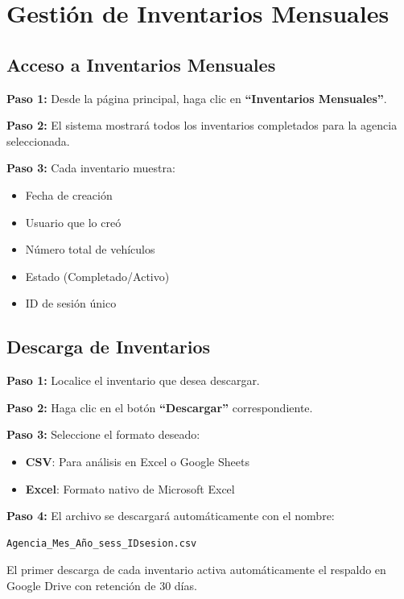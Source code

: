 \documentclass[11pt,a4paper]{article}
\newcommand{\step}[1]{\textbf{\color{primarytext}Paso #1:}}
\newcommand{\button}[1]{\textbf{#1}}
\begin{document}
\section{Gestión de Inventarios Mensuales}

\subsection{Acceso a Inventarios Mensuales}

\step{1} Desde la página principal, haga clic en \button{``Inventarios Mensuales''}.

\step{2} El sistema mostrará todos los inventarios completados para la agencia seleccionada.

\step{3} Cada inventario muestra:
\begin{itemize}
    \item Fecha de creación
    \item Usuario que lo creó
    \item Número total de vehículos
    \item Estado (Completado/Activo)
    \item ID de sesión único
\end{itemize}

\subsection{Descarga de Inventarios}

\step{1} Localice el inventario que desea descargar.

\step{2} Haga clic en el botón \button{``Descargar''} correspondiente.

\step{3} Seleccione el formato deseado:
\begin{itemize}
    \item \textbf{CSV}: Para análisis en Excel o Google Sheets
    \item \textbf{Excel}: Formato nativo de Microsoft Excel
\end{itemize}

\step{4} El archivo se descargará automáticamente con el nombre:
\begin{verbatim}
Agencia_Mes_Año_sess_IDsesion.csv
\end{verbatim}

\begin{successbox}
El primer descarga de cada inventario activa automáticamente el respaldo en Google Drive con retención de 30 días.
\end{successbox}
\end{document}
